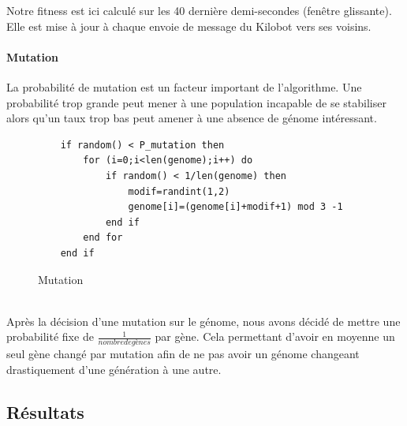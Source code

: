 \documentclass[a4paper]{article}
\begin{document}
Notre fitness est ici calculé sur les 40 dernière demi-secondes (fenêtre glissante). Elle est mise à jour à chaque envoie de message du Kilobot vers ses voisins.
\paragraph{Mutation}  La probabilité de mutation est un facteur important de l'algorithme. Une probabilité trop grande peut mener à une population incapable de se stabiliser alors qu'un taux trop bas peut amener à une absence de génome intéressant.
\begin{figure}[h!]
	\centering
	\begin{lstlisting}
	if random() < P_mutation then
		for (i=0;i<len(genome);i++) do
			if random() < 1/len(genome) then
				modif=randint(1,2)
				genome[i]=(genome[i]+modif+1) mod 3 -1
			end if
		end for
	end if
	\end{lstlisting}
	\caption{Mutation}
\end{figure}
\\ Après la décision d'une mutation sur le génome, nous avons décidé de mettre une probabilité fixe de $\frac{1}{nombre de gènes}$ par gène. Cela permettant d'avoir en moyenne un seul gène changé par mutation afin de ne pas avoir un génome changeant drastiquement d'une génération à une autre.
\newpage


\subsection{Résultats}
\end{document}
